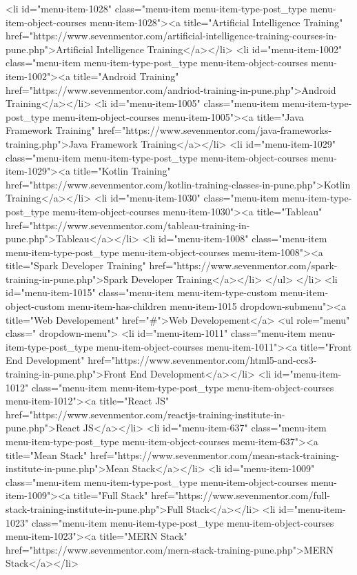 {<li id="menu-item-1028" class="menu-item menu-item-type-post_type menu-item-object-courses menu-item-1028"><a title="Artificial Intelligence Training" href="https://www.sevenmentor.com/artificial-intelligence-training-courses-in-pune.php">Artificial Intelligence Training</a></li>
<li id="menu-item-1002" class="menu-item menu-item-type-post_type menu-item-object-courses menu-item-1002"><a title="Android Training" href="https://www.sevenmentor.com/andriod-training-in-pune.php">Android Training</a></li>
<li id="menu-item-1005" class="menu-item menu-item-type-post_type menu-item-object-courses menu-item-1005"><a title="Java Framework Training" href="https://www.sevenmentor.com/java-frameworks-training.php">Java Framework Training</a></li>
<li id="menu-item-1029" class="menu-item menu-item-type-post_type menu-item-object-courses menu-item-1029"><a title="Kotlin Training" href="https://www.sevenmentor.com/kotlin-training-classes-in-pune.php">Kotlin Training</a></li>
<li id="menu-item-1030" class="menu-item menu-item-type-post_type menu-item-object-courses menu-item-1030"><a title="Tableau" href="https://www.sevenmentor.com/tableau-training-in-pune.php">Tableau</a></li>
<li id="menu-item-1008" class="menu-item menu-item-type-post_type menu-item-object-courses menu-item-1008"><a title="Spark Developer Training" href="https://www.sevenmentor.com/spark-training-in-pune.php">Spark Developer Training</a></li>
</ul>
</li>
<li id="menu-item-1015" class="menu-item menu-item-type-custom menu-item-object-custom menu-item-has-children menu-item-1015 dropdown-submenu"><a title="Web Developement" href="#">Web Developement</a>
<ul role="menu" class=" dropdown-menu">
<li id="menu-item-1011" class="menu-item menu-item-type-post_type menu-item-object-courses menu-item-1011"><a title="Front End Development" href="https://www.sevenmentor.com/html5-and-ccs3-training-in-pune.php">Front End Development</a></li>
<li id="menu-item-1012" class="menu-item menu-item-type-post_type menu-item-object-courses menu-item-1012"><a title="React JS" href="https://www.sevenmentor.com/reactjs-training-institute-in-pune.php">React JS</a></li>
<li id="menu-item-637" class="menu-item menu-item-type-post_type menu-item-object-courses menu-item-637"><a title="Mean Stack" href="https://www.sevenmentor.com/mean-stack-training-institute-in-pune.php">Mean Stack</a></li>
<li id="menu-item-1009" class="menu-item menu-item-type-post_type menu-item-object-courses menu-item-1009"><a title="Full Stack" href="https://www.sevenmentor.com/full-stack-training-institute-in-pune.php">Full Stack</a></li>
<li id="menu-item-1023" class="menu-item menu-item-type-post_type menu-item-object-courses menu-item-1023"><a title="MERN Stack" href="https://www.sevenmentor.com/mern-stack-training-pune.php">MERN Stack</a></li>
}

